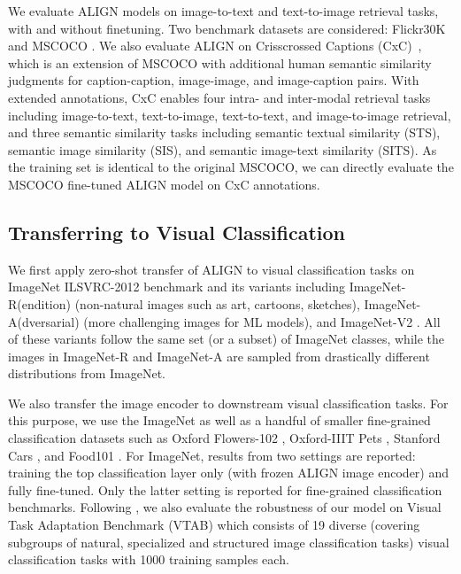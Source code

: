 \documentclass{article}
\begin{document}
We evaluate ALIGN models on image-to-text and text-to-image retrieval tasks, with and without finetuning. Two benchmark datasets are considered: Flickr30K \cite{plummer:flickr30k} and MSCOCO \cite{chen:coco}. We also evaluate ALIGN on Crisscrossed Captions (CxC)~\cite{parekh:cxc}, which is an extension of MSCOCO with additional human semantic similarity judgments for caption-caption, image-image, and image-caption pairs.
With extended annotations, CxC enables four intra- and inter-modal retrieval tasks including image-to-text, text-to-image, text-to-text, and image-to-image retrieval, and three semantic similarity tasks including semantic textual similarity (STS), semantic image similarity (SIS), and semantic image-text similarity (SITS). 
As the training set is identical to the original MSCOCO, we can directly evaluate the MSCOCO fine-tuned ALIGN model on CxC annotations.
\vspace{-0.2cm}
\subsection{Transferring to Visual Classification}

We first apply zero-shot transfer of ALIGN to visual classification tasks on ImageNet ILSVRC-2012 benchmark \cite{deng:imagenet} and its variants including ImageNet-R(endition) \cite{imagenet-r} (non-natural images such as art, cartoons, sketches), ImageNet-A(dversarial) \cite{imagenet-a} (more challenging images for ML models), and ImageNet-V2 \cite{imagenet-v2}. All of these variants follow the same set (or a subset) of ImageNet classes, while the images in ImageNet-R and ImageNet-A are sampled from drastically different distributions from ImageNet.

We also transfer the image encoder to downstream visual classification tasks. For this purpose, we use the  ImageNet as well as a handful of smaller fine-grained classification datasets such as Oxford Flowers-102 \cite{nilsback:flowers}, Oxford-IIIT Pets \cite{parkhi:pets}, Stanford Cars \cite{krause:cars196}, and Food101 \cite{bossard:food101}. For ImageNet, results from two settings are reported: training the top classification layer only (with frozen ALIGN image encoder) and fully fine-tuned. Only the latter setting is reported for fine-grained classification benchmarks. Following \citet{kolensnikov:bit}, we also evaluate the robustness of our model on Visual Task Adaptation Benchmark (VTAB) \cite{zhai:vtab} which consists of 19 diverse (covering subgroups of natural, specialized and structured image classification tasks) visual classification tasks with 1000 training samples each. 
\vspace{-0.3cm}
\end{document}
